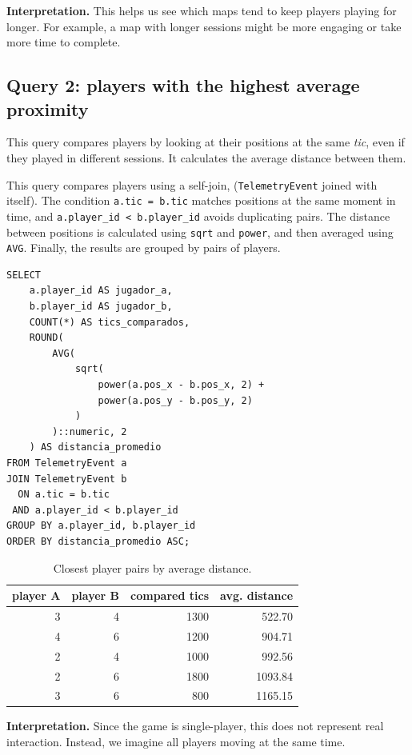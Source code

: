 \documentclass[11pt]{article}
\begin{document}
\textbf{Interpretation.} This helps us see which maps tend to keep players playing for longer. For example, a map with longer sessions might be more engaging or take more time to complete.

\clearpage
\subsection{Query 2: players with the highest average proximity}
This query compares players by looking at their positions at the same \textit{tic}, even if they played in different sessions. It calculates the average distance between them.

This query compares players using a self-join, (\texttt{TelemetryEvent} joined with itself). 
The condition \texttt{a.tic = b.tic} matches positions at the same moment in time, and \texttt{a.player\_id < b.player\_id} avoids duplicating pairs. The distance between positions is calculated using \texttt{sqrt} and \texttt{power}, and then averaged using \texttt{AVG}. Finally, the results are grouped by pairs of players.

\begin{lstlisting}[style=sqlstyle]
SELECT
    a.player_id AS jugador_a,
    b.player_id AS jugador_b,
    COUNT(*) AS tics_comparados,
    ROUND(
        AVG(
            sqrt(
                power(a.pos_x - b.pos_x, 2) +
                power(a.pos_y - b.pos_y, 2)
            )
        )::numeric, 2
    ) AS distancia_promedio
FROM TelemetryEvent a
JOIN TelemetryEvent b
  ON a.tic = b.tic
 AND a.player_id < b.player_id
GROUP BY a.player_id, b.player_id
ORDER BY distancia_promedio ASC;
\end{lstlisting}

\begin{table}[H]
\centering
\begin{tabular}{rrrr}
\toprule
\textbf{player A} & \textbf{player B} & \textbf{compared tics} & \textbf{avg. distance} \\
\midrule
3 & 4 & 1300 & 522.70 \\
4 & 6 & 1200 & 904.71 \\
2 & 4 & 1000 & 992.56 \\
2 & 6 & 1800 & 1093.84 \\
3 & 6 & 800 & 1165.15 \\
\bottomrule
\end{tabular}
\caption{Closest player pairs by average distance.}
\end{table}

\textbf{Interpretation.} Since the game is single-player, this does not represent real interaction. Instead, we imagine all players moving at the same time.
\end{document}
